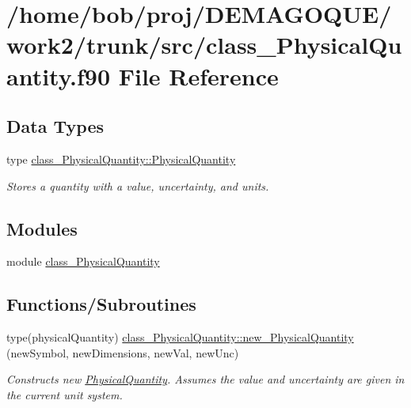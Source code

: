 \hypertarget{class__PhysicalQuantity_8f90}{
\section{/home/bob/proj/DEMAGOQUE/work2/trunk/src/class\_\-PhysicalQuantity.f90 File Reference}
\label{class__PhysicalQuantity_8f90}
}
\subsection*{Data Types}
\begin{DoxyCompactItemize}
\item 
type \hyperlink{typeclass__PhysicalQuantity_1_1PhysicalQuantity}{class\_\-PhysicalQuantity::PhysicalQuantity}
\begin{DoxyCompactList}\small\item\em Stores a quantity with a value, uncertainty, and units. \item\end{DoxyCompactList}\end{DoxyCompactItemize}
\subsection*{Modules}
\begin{DoxyCompactItemize}
\item 
module \hyperlink{namespaceclass__PhysicalQuantity}{class\_\-PhysicalQuantity}
\end{DoxyCompactItemize}
\subsection*{Functions/Subroutines}
\begin{DoxyCompactItemize}
\item 
type(physicalQuantity) \hyperlink{namespaceclass__PhysicalQuantity_a31d0e7291e89fca5b49f9484556cf0cb}{class\_\-PhysicalQuantity::new\_\-PhysicalQuantity} (newSymbol, newDimensions, newVal, newUnc)
\begin{DoxyCompactList}\small\item\em Constructs new \hyperlink{typeclass__PhysicalQuantity_1_1PhysicalQuantity}{PhysicalQuantity}. Assumes the value and uncertainty are given in the current unit system. \item\end{DoxyCompactList}\end{DoxyCompactItemize}
